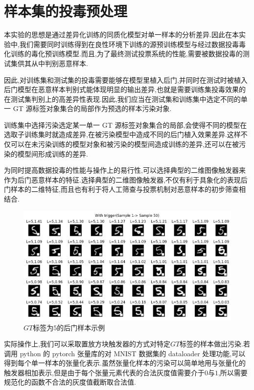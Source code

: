 \section{样本集的投毒预处理}

本实验的思想是通过差异化训练的同质化模型对单一样本的分析差异.因此在本实验中,我们需要同时训练得到在良性环境下训练的源预训练模型与经过数据投毒毒化训练的毒化预训练模型.而且,为了最终测试投票系统的性能,需要被数据投毒的测试集供其从中判别恶意样本.

因此,对训练集和测试集的投毒需要能够在模型里植入后门,并同时在测试时被植入后门模型在恶意样本判别式能体现明显的输出差异,也就是需要训练集投毒效果的在测试集判别上的高差异性表现.因此,我们应当在测试集和训练集中选定不同的单一 GT 源标签对象集合的局部作为预选的样本污染对象.

训练集中选择污染选定某一单一 GT 源标签对象集合的局部,会使得不同的模型在选取子训练集时就造成差异,在被污染模型中造成不同的后门植入效果差异.这样不仅可以在未污染训练的模型对象和被污染的模型间造成训练的差异,还可以在被污染的模型间形成训练的差异.

为同时提高数据投毒的性能与操作上的易行性,可以选择典型的二维图像触发器来作为后门恶意样本的特征.选择典型的二维图像触发器,不仅有利于具象化的表现后门样本的二维特征,而且也有利于将人工筛查与投票机制对恶意样本的初步筛查相结合.

\begin{figure}
	\centering
	\includegraphics[scale=0.5]{Figures/withtrigger.png}
	\caption{$GT$标签为$5$的后门样本示例}
\end{figure}

实际操作上,我们可以采取置放方块触发器的方式对特定$GT$标签的样本做出污染.若调用 python 的 pytorch 张量库的对 MNIST 数据集的 dataloader 处理功能,可以得到每个单一样本的张量化表示.虽然张量化样本的污染可以简单地用与张量化的触发器相加表示,但是由于每个张量元素代表的合法灰度值需要介于$0$与$1$,所以需要规范化的函数不合法的灰度值截断取合法值.

